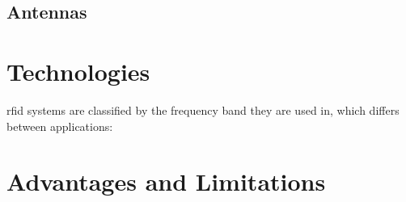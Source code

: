 






\subsection{Antennas}


\section{Technologies}

\ac{rfid} systems are classified by the frequency band they are used in, which differs between applications:

\section{Advantages and Limitations}




